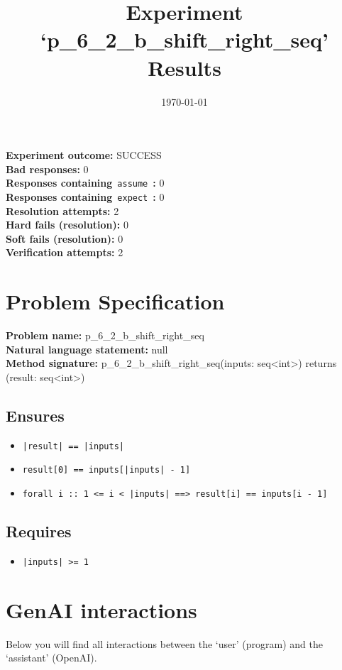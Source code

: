 \documentclass{article}
\begin{document}
\title{Experiment `p\_6\_2\_b\_shift\_right\_seq' Results}
\author{\today}
\date{}
\maketitle
\textbf{Experiment outcome: }SUCCESS
\\\textbf{Bad responses: }0
\\\textbf{Responses containing}~\texttt{assume}~\textbf{: }0
\\\textbf{Responses containing}~\texttt{expect}~\textbf{: }0
\\\textbf{Resolution attempts: }2
\\\textbf{Hard fails (resolution): }0
\\\textbf{Soft fails (resolution): }0
\\\textbf{Verification attempts: }2
\section*{Problem Specification}
\textbf{Problem name: }p\_6\_2\_b\_shift\_right\_seq
\\\textbf{Natural language statement: }null
\\\textbf{Method signature: }p\_6\_2\_b\_shift\_right\_seq(inputs: seq<int>) returns (result: seq<int>)
\subsection*{Ensures}
\begin{itemize}
\item \texttt{|result| == |inputs|}
\item \texttt{result[0] == inputs[|inputs| - 1]}
\item \texttt{forall i :: 1 <= i < |inputs| ==> result[i] == inputs[i - 1]}
\end{itemize}
\subsection*{Requires}
\begin{itemize}
\item \texttt{|inputs| >= 1}
\end{itemize}
\clearpage
\section*{GenAI interactions}
Below you will find all interactions between the `user' (program) and the `assistant' (OpenAI).
\end{document}

